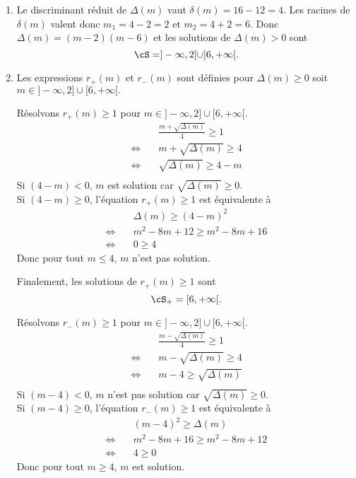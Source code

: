 \begin{correction}
\begin{enumerate}
\item Le discriminant réduit de $\Delta(m)$ vaut $\delta(m) = 16-12=4.$ Les racines de $\delta(m)$ valent  donc $m_1= 4-2=2$ et $m_2=4+2=6$. Donc $\Delta(m) =(m-2)(m-6)$ et 
les solutions de $\Delta(m)>0$ sont
$$\cS = ]-\infty, 2[\cup ] 6,+\infty[.$$

\item Les expressions $r_+(m)$ et $r_-(m)$ sont définies pour $\Delta(m) \geq 0$ soit 
$m\in  ]-\infty, 2]\cup [ 6,+\infty[.$

Résolvons $r_+(m) \geq 1$  pour $ m \in  ]-\infty, 2]\cup [ 6,+\infty[.$
\begin{align*}
& \frac{m+\sqrt{\Delta(m)}}{4} \geq 1\\
\Longleftrightarrow\quad  & m+\sqrt{\Delta(m)} \geq  4 \\
\Longleftrightarrow\quad  & \sqrt{\Delta(m)} \geq  4 -m\\
\end{align*}
Si \underline{$(4-m) <0$}, $m$  est solution car $\sqrt{\Delta(m)} \geq 0$.\\

Si \underline{$(4-m)\geq 0$}, l'équation $r_+(m) \geq 1$  est équivalente à 
\begin{align*}
&\Delta(m) \geq (4-m)^2\\
\Longleftrightarrow\quad  & m^2-8m+12 \geq m^2 -8m +16 \\
\Longleftrightarrow\quad  & 0 \geq 4
\end{align*}
Donc pour tout $m\leq4$, $m$  n'est pas solution. 

Finalement, les solutions de $r_+(m) \geq 1$ sont 
$$\cS_+ = [ 6,+\infty[.$$



Résolvons $r_-(m) \geq 1$  pour $ m \in  ]-\infty, 2]\cup [ 6,+\infty[.$
\begin{align*}
& \frac{m-\sqrt{\Delta(m)}}{4} \geq 1\\
\Longleftrightarrow\quad  & m-\sqrt{\Delta(m)} \geq  4 \\
\Longleftrightarrow\quad  & m-4 \geq   \sqrt{\Delta(m)} \\
\end{align*}
Si \underline{$(m-4) <0$}, $m$  n'est  pas solution car $\sqrt{\Delta(m)} \geq 0$.\\

Si \underline{$(m-4)\geq 0$}, l'équation $r_-(m) \geq 1$  est équivalente à 
\begin{align*}
& (m-4)^2\geq \Delta(m) \\
\Longleftrightarrow\quad  & m^2-8m+16 \geq m^2 -8m +12 \\
\Longleftrightarrow\quad  & 4 \geq 0
\end{align*}
Donc pour tout $m\geq 4$, $m$  est  solution. 


\end{enumerate}
\end{correction}
